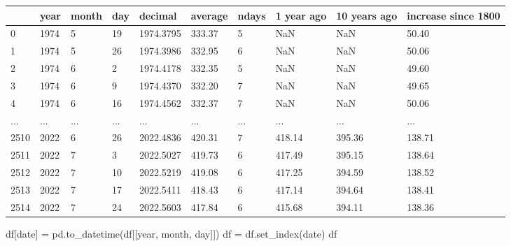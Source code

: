 \documentclass[
  letterpaper,
  DIV=11,
  numbers=noendperiod,
  oneside]{scrreprt}
\newenvironment{Shaded}{\begin{snugshade}}{\end{snugshade}}
\newcommand{\NormalTok}[1]{\textcolor[rgb]{0.00,0.23,0.31}{#1}}
\newcommand{\OperatorTok}[1]{\textcolor[rgb]{0.37,0.37,0.37}{#1}}
\newcommand{\StringTok}[1]{\textcolor[rgb]{0.13,0.47,0.30}{#1}}
\begin{document}
\begin{longtable}[]{@{}llllllllll@{}}
\toprule()
& year & month & day & decimal & average & ndays & 1 year ago & 10 years
ago & increase since 1800 \\
\midrule()
\endhead
0 & 1974 & 5 & 19 & 1974.3795 & 333.37 & 5 & NaN & NaN & 50.40 \\
1 & 1974 & 5 & 26 & 1974.3986 & 332.95 & 6 & NaN & NaN & 50.06 \\
2 & 1974 & 6 & 2 & 1974.4178 & 332.35 & 5 & NaN & NaN & 49.60 \\
3 & 1974 & 6 & 9 & 1974.4370 & 332.20 & 7 & NaN & NaN & 49.65 \\
4 & 1974 & 6 & 16 & 1974.4562 & 332.37 & 7 & NaN & NaN & 50.06 \\
... & ... & ... & ... & ... & ... & ... & ... & ... & ... \\
2510 & 2022 & 6 & 26 & 2022.4836 & 420.31 & 7 & 418.14 & 395.36 &
138.71 \\
2511 & 2022 & 7 & 3 & 2022.5027 & 419.73 & 6 & 417.49 & 395.15 &
138.64 \\
2512 & 2022 & 7 & 10 & 2022.5219 & 419.08 & 6 & 417.25 & 394.59 &
138.52 \\
2513 & 2022 & 7 & 17 & 2022.5411 & 418.43 & 6 & 417.14 & 394.64 &
138.41 \\
2514 & 2022 & 7 & 24 & 2022.5603 & 417.84 & 6 & 415.68 & 394.11 &
138.36 \\
\bottomrule()
\end{longtable}

\begin{Shaded}
\begin{Highlighting}[]
\NormalTok{df[}\StringTok{\textquotesingle{}date\textquotesingle{}}\NormalTok{] }\OperatorTok{=}\NormalTok{ pd.to\_datetime(df[[}\StringTok{\textquotesingle{}year\textquotesingle{}}\NormalTok{, }\StringTok{\textquotesingle{}month\textquotesingle{}}\NormalTok{, }\StringTok{\textquotesingle{}day\textquotesingle{}}\NormalTok{]])}
\NormalTok{df }\OperatorTok{=}\NormalTok{ df.set\_index(}\StringTok{\textquotesingle{}date\textquotesingle{}}\NormalTok{)}
\NormalTok{df}
\end{Highlighting}
\end{Shaded}
\end{document}
